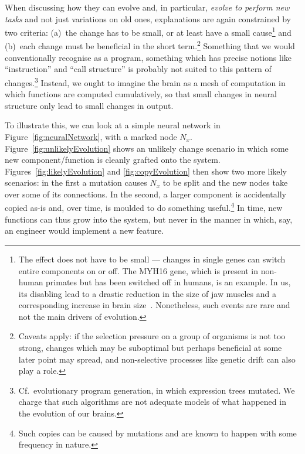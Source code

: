 When discussing how they can evolve and, in particular, {\em evolve to perform new tasks} and not just variations on old ones, explanations are again constrained by two criteria: (a)~the change has to be small, or at least have a small cause\footnote{The effect does not have to be small --- changes in single genes can switch entire components on or off. The MYH16 gene, which is present in non-human primates but has been switched off in humans, is an example. In us, its disabling lead to a drastic reduction in the size of jaw muscles and a corresponding increase in brain size~\cite{carroll2005}. Nonetheless, such events are rare and not the main drivers of evolution.} and (b)~each change must be beneficial in the short term.\footnote{Caveats apply: if the selection pressure on a group of organisms is not too strong, changes which may be suboptimal but perhaps beneficial at some later point may spread, and non-selective processes like genetic drift can also play a role.} Something that we would conventionally recognise as a program, something which has precise notions like ``instruction'' and ``call structure'' is probably not suited to this pattern of changes.\footnote{Cf.\ evolutionary program generation, in which expression trees mutated. We charge that such algorithms are not adequate models of what happened in the evolution of our brains.} Instead, we ought to imagine the brain as a mesh of computation in which functions are computed cumulatively, so that small changes in neural structure only lead to small changes in output.

To illustrate this, we can look at a simple neural network in Figure~\ref{fig:neuralNetwork}, with a marked node $N_x$. Figure~\ref{fig:unlikelyEvolution} shows an unlikely change scenario in which some new component/function is cleanly grafted onto the system. Figures~\ref{fig:likelyEvolution} and \ref{fig:copyEvolution} then show two more likely scenarios: in the first a mutation causes $N_x$ to be split and the new nodes take over some of its connections. In the second, a larger component is accidentally copied as-is and, over time, is moulded to do something useful.\footnote{Such copies can be caused by mutations and are known to happen with some frequency in nature.} In time, new functions can thus grow into the system, but never in the manner in which, say, an engineer would implement a new feature. 


